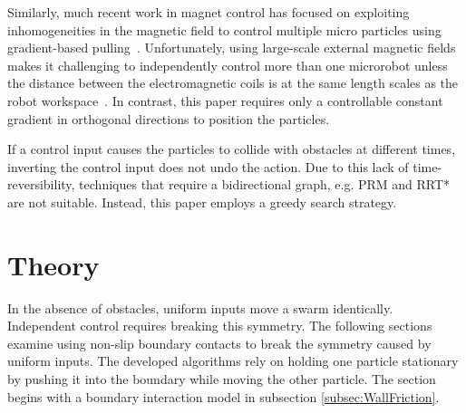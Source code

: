 Similarly, much recent work in magnet control has focused on exploiting inhomogeneities in the magnetic field to control multiple micro particles  using gradient-based pulling~\cite{Salmanipour2018EightDOF,Denasi2018independent}.  
Unfortunately, using large-scale external magnetic fields makes it challenging to independently control more than one microrobot unless the  distance between the electromagnetic coils is at the same length scales as the robot workspace~\cite{diller2016six, Denasi2018independent, Salmanipour2018EightDOF}. In contrast, %
 this paper requires only a controllable constant gradient in orthogonal directions to position the particles.


If a control input causes the particles to collide with obstacles at different times, inverting the control input does not undo the action. 
 Due to this lack of time-reversibility, techniques that require a bidirectional graph, e.g. PRM \cite{kavraki1996probabilistic} and RRT* \cite{lavalle2006planning} are not suitable.
  Instead, this paper employs a greedy search strategy. 

\section{Theory}
\label{sec:theory}
 In the absence of obstacles, uniform inputs move a swarm identically.  
 Independent control requires breaking this symmetry. 
The following sections examine using non-slip boundary contacts to break the symmetry caused by uniform inputs.  
 The developed algorithms rely on holding one particle stationary by pushing it into the boundary while moving the other particle. 
 The section begins with a boundary interaction model in subsection \ref{subsec:WallFriction}.
 

